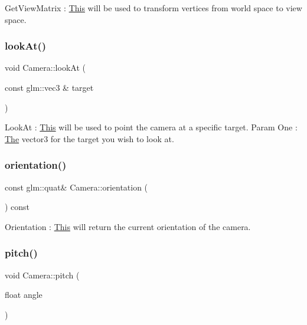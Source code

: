 Get\+View\+Matrix \+: \mbox{\hyperlink{class_this}{This}} will be used to transform vertices from world space to view space. \mbox{\label{class_camera_aec0442093303b9568a159f8c87f8b7d8}} 
\subsubsection{\texorpdfstring{look\+At()}{lookAt()}}
{\footnotesize\ttfamily void Camera\+::look\+At (\begin{DoxyParamCaption}\item[{const glm\+::vec3 \&}]{target }\end{DoxyParamCaption})\hspace{0.3cm}{\ttfamily [inline]}}

Look\+At \+: \mbox{\hyperlink{class_this}{This}} will be used to point the camera at a specific target. Param One \+: \mbox{\hyperlink{class_the}{The}} vector3 for the target you wish to look at. \mbox{\label{class_camera_a872dd113215278493380d19716c63644}} 
\subsubsection{\texorpdfstring{orientation()}{orientation()}}
{\footnotesize\ttfamily const glm\+::quat\& Camera\+::orientation (\begin{DoxyParamCaption}{ }\end{DoxyParamCaption}) const\hspace{0.3cm}{\ttfamily [inline]}}

Orientation \+: \mbox{\hyperlink{class_this}{This}} will return the current orientation of the camera. \mbox{\label{class_camera_a49e00b90b94853e4485a6bdf063796de}} 
\subsubsection{\texorpdfstring{pitch()}{pitch()}}
{\footnotesize\ttfamily void Camera\+::pitch (\begin{DoxyParamCaption}\item[{float}]{angle }\end{DoxyParamCaption})\hspace{0.3cm}{\ttfamily [inline]}}

